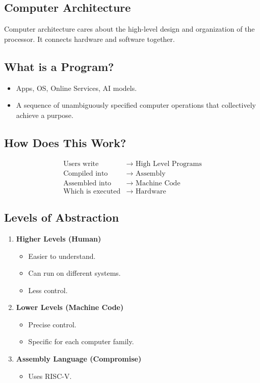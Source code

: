 \documentclass{article}
\begin{document}
\subsection*{Computer Architecture}
Computer architecture cares about the high-level design and organization of the processor. It connects hardware and software together.

\subsection*{What is a Program?}
\begin{itemize}
    \item Apps, OS, Online Services, AI models.
    \item A sequence of unambiguously specified computer operations that collectively achieve a purpose.
\end{itemize}

\subsection*{How Does This Work?}
\begin{align*}
    \text{Users write} &\rightarrow \text{ High Level Programs} \\
    \text{Compiled into} &\rightarrow \text{ Assembly} \\
    \text{Assembled into} &\rightarrow \text{ Machine Code} \\
    \text{Which is executed} &\rightarrow \text{ Hardware}
\end{align*}

\subsection*{Levels of Abstraction}
\begin{enumerate}
    \item \textbf{Higher Levels (Human)}
    \begin{itemize}
        \item Easier to understand.
        \item Can run on different systems.
        \item Less control.
    \end{itemize}

    \item \textbf{Lower Levels (Machine Code)}
    \begin{itemize}
        \item Precise control.
        \item Specific for each computer family.
    \end{itemize}

    \item \textbf{Assembly Language (Compromise)}
    \begin{itemize}
        \item Uses RISC-V.
    \end{itemize}
\end{enumerate}
\end{document}
